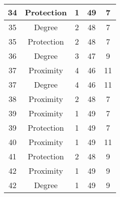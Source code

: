 \documentclass[results.tex]{subfiles}
\begin{document}
\begin{center}
\begin{tabular}{| c || c | c | c | c |}
            \hline
            34                      & Protection                   & 1                      & 49                      & 7                    \\
            \hline
            35                      & Degree                       & 2                      & 48                      & 7                    \\
            \hline
            35                      & Protection                   & 2                      & 48                      & 7                    \\
            \hline
            36                      & Degree                       & 3                      & 47                      & 9                    \\
            \hline
            37                      & Proximity                    & 4                      & 46                      & 11                   \\
            \hline
            37                      & Degree                       & 4                      & 46                      & 11                   \\
            \hline
            38                      & Proximity                    & 2                      & 48                      & 7                    \\
            \hline
            39                      & Proximity                    & 1                      & 49                      & 7                    \\
            \hline
            39                      & Protection                   & 1                      & 49                      & 7                    \\
            \hline
            40                      & Proximity                    & 1                      & 49                      & 11                   \\
            \hline
            41                      & Protection                   & 2                      & 48                      & 9                    \\
            \hline
            42                      & Proximity                    & 1                      & 49                      & 9                    \\
            \hline
            42                      & Degree                       & 1                      & 49                      & 9                    \\

\end{tabular}
\end{center}
\end{document}
